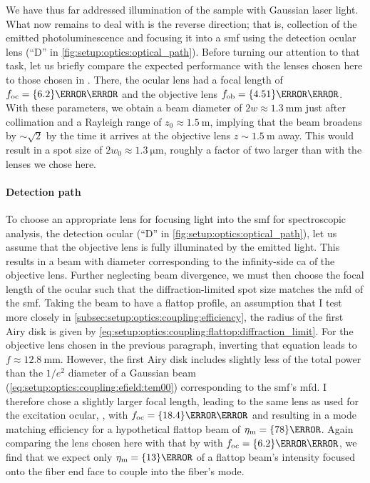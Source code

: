 We have thus far addressed illumination of the sample with Gaussian laser light.
What now remains to deal with is the reverse direction; that is, collection of the emitted photoluminescence and focusing it into a \gls{smf} using the detection ocular lens (\enquote{D} in \cref{fig:setup:optics:optical_path}).
Before turning our attention to that task, let us briefly compare the expected performance with the lenses chosen here to those chosen in .
There, the ocular lens had a focal length of $\foc = \qty{6.2}{\milli\meter}$ and the objective lens $\fob = \qty{4.51}{\milli\meter}$.
With these parameters, we obtain a beam diameter of $2w \approx\qty{1.3}{\milli\meter}$ just after collimation and a Rayleigh range of $z_0\approx\qty{1.5}{\meter}$, implying that the beam broadens by $\sim\sqrt{2}$ by the time it arrives at the objective lens $z\sim\qty{1.5}{\meter}$ away.
This would result in a spot size of $2 w_0\approx\qty{1.3}{\micro\meter}$, roughly a factor of two larger than with the lenses we chose here.

\paragraph{Detection path}\label{par:setup:optics:coupling:detection}
To choose an appropriate lens for focusing light into the \gls{smf} for spectroscopic analysis, the detection ocular (\enquote{D} in \cref{fig:setup:optics:optical_path}), let us assume that the objective lens is fully illuminated by the emitted light.
This results in a beam with diameter corresponding to the infinity-side \gls{ca} of the objective lens.
Further neglecting beam divergence, we must then choose the focal length of the ocular such that the diffraction-limited spot size matches the \gls{mfd} of the \gls{smf}.
Taking the beam to have a flattop profile, an assumption that I test more closely in \cref{subsec:setup:optics:coupling:efficiency}, the radius of the first Airy disk is given by \cref{eq:setup:optics:coupling:flattop:diffraction_limit}.
For the objective lens chosen in the previous paragraph, inverting that equation leads to $f\approx\qty{12.8}{\milli\meter}$.
However, the first Airy disk includes slightly less of the total power than the $1/e^2$ diameter of a Gaussian beam (\cf \cref{eq:setup:optics:coupling:efield:tem00}) corresponding to the \gls{smf}'s \gls{mfd}.
I therefore chose a slightly larger focal length, leading to the same lens as used for the excitation ocular, \ocularlens, with $\foc = \qty{18.4}{\milli\meter}$ and resulting in a mode matching efficiency for a hypothetical flattop beam of $\eta_{\mr{m}} = \qty{78}{\percent}$.
Again comparing the lens chosen here with that by  with $\foc = \qty{6.2}{\milli\meter}$, we find that we expect only $\eta_{\mr{m}} = \qty{13}{\percent}$ of a flattop beam's intensity focused onto the fiber end face to couple into the fiber's  mode.

